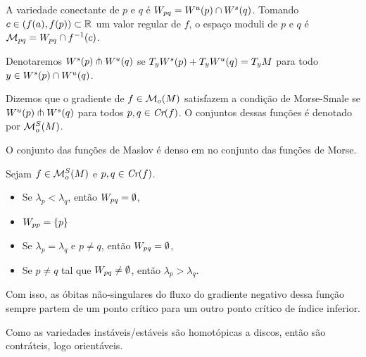 \documentclass{beamer}
\begin{document}
	\begin{frame}
		
		\begin{definicao}
			A variedade conectante de $p$ e $q$ é $W_{pq} = W^{u}(p)\cap W^{s}(q)$. Tomando $c \in (f(a), f(p)) \subset \mathbb{R}^{}$ um valor regular de $f$, o espaço moduli de $p$ e $q$ é $\mathcal{M}_{pq} = W_{pq}\cap f^{-1}(c)$.
		\end{definicao}
		
		Denotaremos $W^{s}(p)\pitchfork W^{u}(q)$ se $T_{y}W^{s}(p) + T_{y}W^{u}(q) = T_{y}M$ para todo $y \in W^{s}(p)\cap W^{u}(q)$.
		\begin{definicao}
			Dizemos que o gradiente de $f \in \mathcal{M}_{o}(M)$ satisfazem a condição de Morse-Smale se $W^{u}(p)\pitchfork W^{s}(q)$ para todos $p,q \in \textit{Cr}(f)$. O conjuntos dessas funções é denotado por $\mathcal{M}^{S}_{o}(M)$.
		\end{definicao}

		\begin{tiny}
			O conjunto das funções de Maslov é denso em no conjunto das funções de Morse.
		\end{tiny}		
	\end{frame}
	
	\begin{frame}
		\begin{proposicao}
			Sejam $f \in \mathcal{M}^{S}_{o}(M)$ e $p,q \in \textit{Cr}(f)$.
			\begin{itemize}
				\item Se $\lambda_{p}<\lambda_{q}$, então $W_{pq} = \emptyset$,
				
				\item $W_{pp} = \{p\}$
				
				\item Se $\lambda_{p} = \lambda_{q}$ e $p\neq q$, então $W_{pq} = \emptyset$,
				
				\item Se $p \neq q$ tal que $W_{pq} \neq \emptyset$, então $\lambda_{p}>\lambda_{q}$.
			\end{itemize}
		\end{proposicao}
		
		Com isso, as óbitas não-singulares do fluxo do gradiente negativo dessa função sempre partem de um ponto crítico para um outro ponto crítico de índice inferior.

		\begin{tiny}
			Como as variedades instáveis/estáveis são homotópicas a discos, então são contráteis, logo orientáveis.
		\end{tiny}		
	\end{frame}
	
\end{document}
